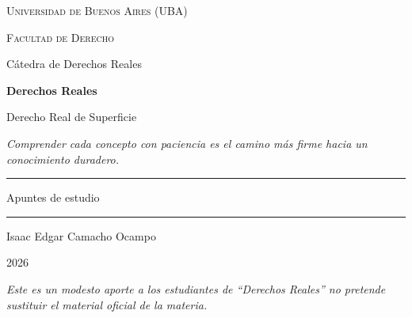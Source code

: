 \documentclass[12pt,oneside]{book}
\newcommand{\universidad}{Universidad de Buenos Aires (UBA)}
\newcommand{\facultad}{Facultad de Derecho}
\newcommand{\catedra}{Cátedra de Derechos Reales}
\newcommand{\materia}{Derechos Reales}
\newcommand{\titulo}{Derecho Real de Superficie}
\newcommand{\autor}{Isaac Edgar Camacho Ocampo}
\newcommand{\anio}{2026}
\begin{document}
\begin{titlepage}

\thispagestyle{empty}

\begin{center}

\vspace*{1cm}

{\large \textsc{\universidad}}

\vspace{0.2cm}

{\large \textsc{\facultad}}

\vspace{0.2cm}

{\large \catedra}

\vspace{3cm}

{\Huge \textbf{\materia}}

\vspace{1cm}

{\LARGE \titulo}

\vspace{0.8cm}

\textit{Comprender cada concepto con paciencia es el camino más firme hacia un conocimiento duradero.}

\vspace{1.2cm}

\rule{0.70\textwidth}{0.5pt}

\vspace{0.5cm}

{\large Apuntes de estudio}

\vspace{0.5cm}

\rule{0.70\textwidth}{0.5pt}

\vfill

{\large \autor}

\vspace{0.3cm}

{\large \anio}

\end{center}

\vfill

\begin{flushleft}
\textit{Este es un modesto aporte a los estudiantes de ``Derechos Reales'' no pretende sustituir el material oficial de la materia.}
\end{flushleft}

\end{titlepage}
\end{document}

